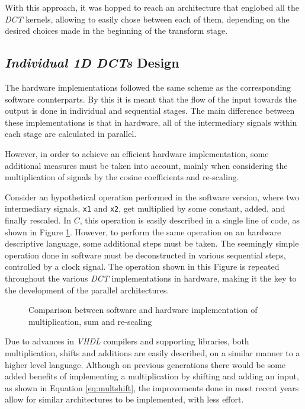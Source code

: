 With this approach, it was hopped to reach an architecture that englobed all the \emph{DCT} kernels, allowing to easily chose between each of them, depending on the desired choices made in the beginning of the transform stage.

\subsection{\emph{Individual 1D DCTs} Design}

The hardware implementations followed the same scheme as the corresponding software counterparts. By this it is meant that the flow of the input towards the output is done in individual and sequential stages. The main difference between these implementations is that in hardware, all of the intermediary signals within each stage are calculated in parallel. 

However, in order to achieve an efficient hardware implementation, some additional measures must be taken into account, mainly when considering the multiplication of signals by the cosine coefficients and re-scaling.

Consider an hypothetical operation performed in the software version, where two intermediary signals, \texttt{x1} and \texttt{x2}, get multiplied by some constant, added, and finally rescaled. In $C$, this operation is easily described in a single line of code, as shown in Figure \ref{fig:hardsoft}. However, to perform the same operation on an hardware descriptive language, some additional steps must be taken. The seemingly simple operation done in software must be deconstructed in various sequential steps, controlled by a clock signal. The operation shown in this Figure is repeated throughout the various \emph{DCT} implementations in hardware, making it the key to the development of the parallel architectures.

\begin{figure}[!htbp]
    \centering
    
    \caption{Comparison between software and hardware implementation of multiplication, sum and re-scaling}
    \label{fig:hardsoft}
\end{figure}

Due to advances in \emph{VHDL} compilers and supporting libraries, both multiplication, shifts and additions are easily described, on a similar manner to a higher level language. Although on previous generations there would be some added benefits of implementing a multiplication by shifting and adding an input, as shown in Equation \ref{eq:multshift}, the improvements done in most recent years allow for similar architectures to be implemented, with less effort.

